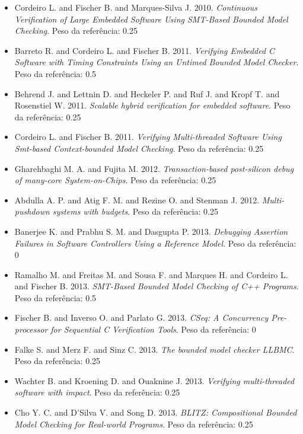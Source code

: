 \begin{itemize}
\item Cordeiro L. and Fischer B. and Marques-Silva J.
      2010.
      {\it Continuous Verification of Large Embedded Software Using SMT-Based Bounded Model Checking}.
      Peso da referência: 0.25
\item Barreto R. and Cordeiro L. and Fischer B.
      2011.
      {\it Verifying Embedded C Software with Timing Constraints Using an Untimed Bounded Model Checker}.
      Peso da referência: 0.5
\item Behrend J. and Lettnin D. and Heckeler P. and Ruf J. and Kropf T. and Rosenstiel W.
      2011.
      {\it Scalable hybrid verification for embedded software}.
      Peso da referência: 0.25
\item Cordeiro L. and Fischer B.
      2011.
      {\it Verifying Multi-threaded Software Using Smt-based Context-bounded Model Checking}.
      Peso da referência: 0.25
\item Gharehbaghi M. A. and Fujita M.
      2012.
      {\it Transaction-based post-silicon debug of many-core System-on-Chips}.
      Peso da referência: 0.25
\item Abdulla A. P. and Atig F. M. and Rezine O. and Stenman J.
      2012.
      {\it Multi-pushdown systems with budgets}.
      Peso da referência: 0.25
\item Banerjee K. and Prabhu S. M. and Dasgupta P.
      2013.
      {\it Debugging Assertion Failures in Software Controllers Using a Reference Model}.
      Peso da referência: 0
\item Ramalho M. and Freitas M. and Sousa F. and Marques H. and Cordeiro L. and Fischer B.
      2013.
      {\it SMT-Based Bounded Model Checking of C++ Programs}.
      Peso da referência: 0.5
\item Fischer B. and Inverso O. and Parlato G.
      2013.
      {\it CSeq: A Concurrency Pre-processor for Sequential C Verification Tools}.
      Peso da referência: 0
\item Falke S. and Merz F. and Sinz C.
      2013.
      {\it The bounded model checker LLBMC}.
      Peso da referência: 0.25
\item Wachter B. and Kroening D. and Ouaknine J.
      2013.
      {\it Verifying multi-threaded software with impact}.
      Peso da referência: 0.25
\item Cho Y. C. and D'Silva V. and Song D.
      2013.
      {\it BLITZ: Compositional Bounded Model Checking for Real-world Programs}.
      Peso da referência: 0.25

\end{itemize}
